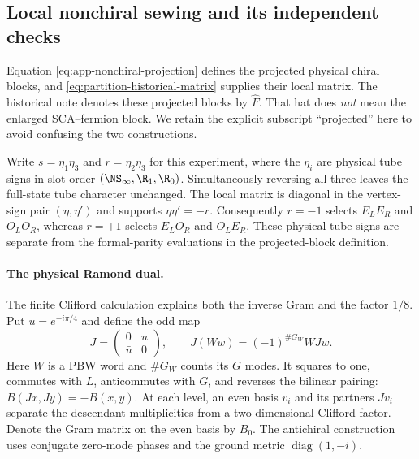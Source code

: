 \subsection{Local nonchiral sewing and its independent checks}

Equation \eqref{eq:app-nonchiral-projection} defines the projected
physical chiral blocks, and \eqref{eq:partition-historical-matrix} supplies
their local matrix. The historical note denotes these projected
blocks by $\widehat F$. That hat does \emph{not} mean the enlarged
SCA--fermion block. We retain the explicit subscript ``projected''
here to avoid confusing the two constructions.

Write $s=\eta_1\eta_3$ and $r=\eta_2\eta_3$ for this experiment,
where the $\eta_i$ are physical tube signs in slot order
$(\NS_\infty,\R_1,\R_0)$. Simultaneously reversing all three
leaves the full-state tube character unchanged. The local matrix
is diagonal in the vertex-sign pair $(\eta,\eta')$ and supports
$\eta\eta'=-r$. Consequently $r=-1$ selects $E_LE_R$ and
$O_LO_R$, whereas $r=+1$ selects $E_LO_R$ and $O_LE_R$.
These physical tube signs are separate from the formal-parity
evaluations in the projected-block definition.

\paragraph{The physical Ramond dual.}
The finite Clifford calculation explains both the inverse Gram and
the factor $1/8$. Put $u=e^{-i\pi/4}$ and define the odd map
\begin{equation}
 J=\begin{pmatrix}0&u\\\bar u&0\end{pmatrix},\qquad
 J(Ww)=(-1)^{\#G_W}WJw.
 \label{eq:partition-J}
\end{equation}
Here $W$ is a PBW word and $\#G_W$ counts its $G$ modes.
It squares to one, commutes with $L$, anticommutes with $G$, and
reverses the bilinear pairing: $B(Jx,Jy)=-B(x,y)$.
At each level, an even basis $v_i$ and its partners $Jv_i$ separate
the descendant multiplicities from a two-dimensional Clifford
factor. Denote the Gram matrix on the even basis by $B_0$.
The antichiral construction uses conjugate zero-mode phases and
the ground metric $\operatorname{diag}(1,-i)$.

